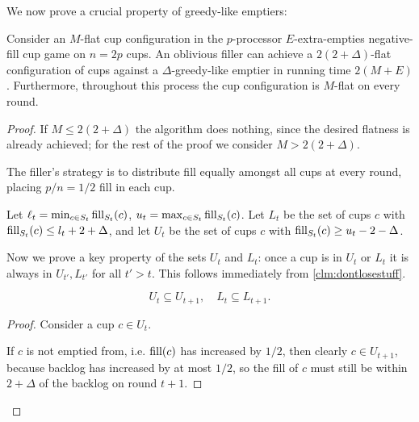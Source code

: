 We now prove a crucial property of greedy-like emptiers: 
\begin{lemma}
  \label{lem:greedylikeisflat}
  Consider an $M$-flat cup configuration in the $p$-processor
  $E$-extra-empties negative-fill cup game on $n = 2p$ cups. An
  oblivious filler can achieve a $2(2+\Delta)$-flat configuration
  of cups against a $\Delta$-greedy-like emptier in running time
  $2(M+E)$. Furthermore, throughout this process the cup configuration
  is $M$-flat on every round.
\end{lemma}
\begin{proof}
  If $M \le 2(2+\Delta)$ the algorithm does nothing, since the
  desired flatness is already achieved; for
  the rest of the proof we consider $M > 2(2+\Delta)$.

  The filler's strategy is to distribute fill equally amongst all
  cups at every round, placing $p/n = 1/2$ fill in each cup. 

  Let $\ell_t = \min_{c\in S_t} \operatorname{\textnormal{fill}}_{S_t}(c)$, $u_t = \max_{c\in S_t} \operatorname{\textnormal{fill}}_{S_t}(c)$. 
  Let $L_t$ be the set of cups $c$ with $\operatorname{\textnormal{fill}}_{S_t}(c) \le l_t+2+\Delta$, and let
  $U_t$ be the set of cups $c$ with $\operatorname{\textnormal{fill}}_{S_t}(c) \ge u_t-2-\Delta$.

  Now we prove a key property of the sets $U_t$ and $L_t$: once a cup is in
  $U_t$ or $L_t$ it is always in $U_{t'}, L_{t'}$ for all $t' > t$. This
  follows immediately from \cref{clm:dontlosestuff}.
  \begin{clm}
    \label{clm:dontlosestuff}
    $$U_{t} \subseteq U_{t+1},\quad L_t \subseteq L_{t+1}.$$
  \end{clm}
  \begin{proof}
    Consider a cup $c\in U_t$.

    If $c$ is not emptied from, i.e. $\operatorname{\textnormal{fill}}(c)$ has increased by $1/2$, then
    clearly $c \in U_{t+1}$, because backlog has increased by at most $1/2$, so
    the fill of $c$ must still be within $2+\Delta$ of the backlog on round $t+1$. 


\end{proof}
\end{proof}
